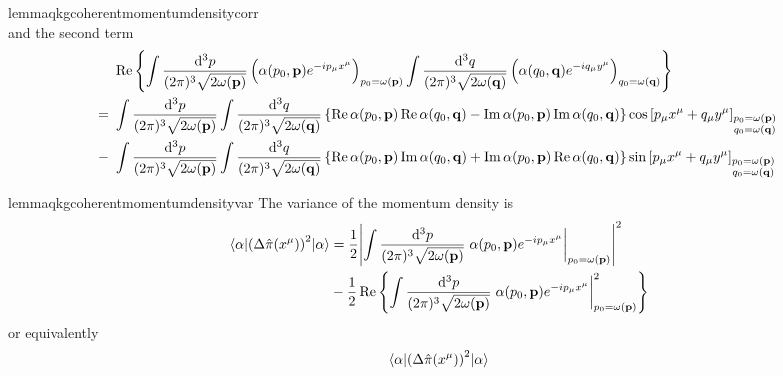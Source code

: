 \begin{restatable}{lemma}{qkgcoherentmomentumdensitycorr}
\begin{equation*}
	\end{equation*}
	and the second term
	\begin{equation*}
		\begin{split}
			&\
			\operatorname{\operatorname{Re}}\left\{
				\int\frac{\dd[3]{p}}{(2\pi)^3\sqrt{2\omega(\vb{p})}}
				\left(
					\alpha(p_0,\vb{p})
					e^{-ip_\mu x^\mu}
				\right)_{p_0=\omega(\vb{p})}
				\int\frac{\dd[3]{q}}{(2\pi)^3\sqrt{2\omega(\vb{q})}}
				\left(
					\alpha(q_0,\vb{q})
					e^{-iq_\mu y^\mu}
				\right)_{q_0=\omega(\vb{q})}			
			\right\}
			\\
			=&\
			\int\frac{\dd[3]{p}}{(2\pi)^3\sqrt{2\omega(\vb{p})}}
			\int\frac{\dd[3]{q}}{(2\pi)^3\sqrt{2\omega(\vb{q})}}
			\left\{
				\operatorname{\operatorname{Re}}\alpha(p_0,\vb{p})
				\operatorname{\operatorname{Re}}\alpha(q_0,\vb{q})
				-
				\operatorname{\operatorname{Im}}\alpha(p_0,\vb{p})
				\operatorname{\operatorname{Im}}\alpha(q_0,\vb{q})
			\right\}
			\cos\left[
				p_\mu x^\mu
				+
				q_\mu y^\mu
			\right]_{\substack{p_0=\omega(\vb{p})\\q_0=\omega(\vb{q})}}
			\\
			-&\
			\int\frac{\dd[3]{p}}{(2\pi)^3\sqrt{2\omega(\vb{p})}}
			\int\frac{\dd[3]{q}}{(2\pi)^3\sqrt{2\omega(\vb{q})}}
			\left\{
				\operatorname{\operatorname{Re}}\alpha(p_0,\vb{p})
				\operatorname{\operatorname{Im}}\alpha(q_0,\vb{q})
				+
				\operatorname{\operatorname{Im}}\alpha(p_0,\vb{p})
				\operatorname{\operatorname{Re}}\alpha(q_0,\vb{q})
			\right\}
			\sin\left[
				p_\mu x^\mu
				+
				q_\mu y^\mu
			\right]_{\substack{p_0=\omega(\vb{p})\\q_0=\omega(\vb{q})}}
		\end{split}
	\end{equation*}
\end{restatable}
\begin{restatable}{lemma}{qkgcoherentmomentumdensityvar}\label{thm:qkg_coherent_momentum_density_var}
	The variance of the momentum density is
	\begin{equation}
		\begin{split}
			\expval{\left(\Delta\hat\pi(x^\mu)\right)^2}{\alpha}
			&=
			\frac{1}{2}
			\abs{
				\int\frac{\dd[3]{p}}{(2\pi)^3\sqrt{2\omega(\vb{p})}}
				\eval{
					\alpha(p_0,\vb{p})
					e^{-ip_\mu x^\mu}
				}_{p_0=\omega(\vb{p})}
			}^2
			\\
			&-
			\frac{1}{2}
			\Re\left\{
				\int\frac{\dd[3]{p}}{(2\pi)^3\sqrt{2\omega(\vb{p})}}
				\eval{
					\alpha(p_0,\vb{p})
					e^{-ip_\mu x^\mu}
				}_{p_0=\omega(\vb{p})}^2
			\right\}
		\end{split}
	\end{equation}
	or equivalently
	\begin{equation*}
		\begin{split}
			\expval{\left(\Delta\hat\pi(x^\mu)\right)^2}{\alpha}
		\end{split}
	\end{equation*}
\end{restatable}

